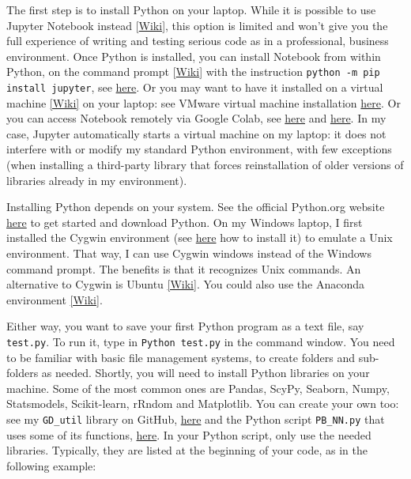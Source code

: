\documentclass[oneside,10pt]{book}
\begin{document}
The first step is to install Python on your laptop. While it is possible to use \textcolor{index}{Jupyter Notebook} instead [\href{https://jupyter.org/}{Wiki}], this option is limited and won't give you the full experience of writing and testing serious code as in a professional, business environment. Once Python is installed, you can install Notebook from within Python, on the  
\textcolor{index}{command prompt} [\href{https://en.wikipedia.org/wiki/Cmd.exe}{Wiki}] 
with the instruction 
 \texttt{python -m pip install jupyter}, 
see \href{https://www.geeksforgeeks.org/how-to-install-jupyter-notebook-in-windows/}{here}. Or you may want to have it installed on a 
\textcolor{index}{virtual machine}  \href{https://en.wikipedia.org/wiki/Virtual_machine}{[Wiki]} on your laptop: see VMware virtual machine installation \href{https://www.vmware.com/products/workstation-player.html}{here}.
Or you can access Notebook remotely via
 \textcolor{index}{Google Colab}, see \href{https://colab.research.google.com/notebooks/}{here} and \href{https://colab.research.google.com/}{here}. In my case, Jupyter automatically starts a virtual machine on my laptop: it does not interfere with or modify my standard Python environment, with few exceptions (when installing a third-party library that forces reinstallation of older versions of libraries
 already in my environment).



Installing Python depends on your system. See the official Python.org website \href{https://www.python.org/downloads/}{here} to get started and download Python. On my Windows laptop, I first installed the Cygwin environment (see \href{https://www.cygwin.com/}{here} how to install it) to emulate a Unix environment. That way, I can use Cygwin windows instead of the Windows command prompt. The benefits is that it recognizes Unix commands. An alternative to Cygwin is \textcolor{index}{Ubuntu}
\href{https://ubuntu.com/download}{[Wiki]}. 
You could also use the \textcolor{index}{Anaconda}  environment \href{https://www.anaconda.com/products/distribution}{[Wiki]}. 

Either way, you want to save your first Python program as a text file, say \texttt{test.py}. To run it, type in \texttt{Python test.py} in the command window. You need to be familiar with basic file management systems, to create folders and sub-folders as needed. Shortly, you will need to install Python libraries on your machine. Some of the  most common ones are Pandas, ScyPy, Seaborn, Numpy, Statsmodels, Scikit-learn, rRndom and Matplotlib. You can create your own too: see my \texttt{GD\_util} library on GitHub, \href{https://github.com/VincentGranville/Point-Processes/blob/main/Source%20Code/GD_util.py}{here} 
and the Python script \texttt{PB\_NN.py} that uses some of its functions, 
\href{https://github.com/VincentGranville/Point-Processes/blob/main/Source%20Code/PB_NN.py}{here}.
In your Python script, only use the needed libraries. Typically, they are listed at the beginning of your code, as in the following example:\vspace{1ex}
\end{document}
